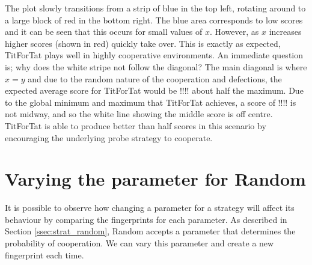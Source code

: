 The plot slowly transitions from a strip of blue in the top left, rotating around to a large block of red in the bottom right.
The blue area corresponds to low scores and it can be seen that this occurs for small values of $x$.
However, as $x$ increases higher scores (shown in red) quickly take over.
This is exactly as expected, TitForTat plays well in highly cooperative environments.
An immediate question is; why does the white stripe not follow the diagonal?
The main diagonal is where $x=y$ and due to the random nature of the cooperation and defections, the expected average score for TitForTat would be !!!! about half the maximum.
Due to the global minimum and maximum that TitForTat achieves, a score of !!!! is not midway, and so the white line showing the middle score is off centre.
TitForTat is able to produce better than half scores in this scenario by encouraging the underlying probe strategy to cooperate.

\section{Varying the parameter for Random}
It is possible to observe how changing a parameter for a strategy will affect its behaviour by comparing the fingerprints for each parameter.
As described in Section \ref{ssec:strat_random}, Random accepts a parameter that determines the probability of cooperation.
We can vary this parameter and create a new fingerprint each time.

